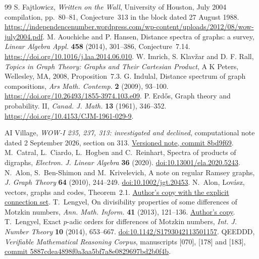 \documentclass[11pt,a4paper]{article}
\begin{document}
\begin{thebibliography}{99}\small
{} S. Fajtlowicz, \emph{Written on the Wall}, University of Houston, July 2004 compilation, pp.~80--81, Conjecture~313 in the block dated 27 August 1988. \url{https://independencenumber.wordpress.com/wp-content/uploads/2012/08/wow-july2004.pdf}.
 M. Aouchiche and P. Hansen, Distance spectra of graphs: a survey, \emph{Linear Algebra Appl.} \textbf{458} (2014), 301--386, Conjecture~7.14. \url{https://doi.org/10.1016/j.laa.2014.06.010}.
 W. Imrich, S. Klav\v zar and D. F. Rall, \emph{Topics in Graph Theory: Graphs and Their Cartesian Product}, A K Peters, Wellesley, MA, 2008, Proposition~7.3.
 G. Indulal, Distance spectrum of graph compositions, \emph{Ars Math. Contemp.} \textbf{2} (2009), 93--100. \url{https://doi.org/10.26493/1855-3974.103.e09}.
 P. Erd\H{o}s, Graph theory and probability. II, \emph{Canad. J. Math.} \textbf{13} (1961), 346--352. \url{https://doi.org/10.4153/CJM-1961-029-9}.

 AI Village, \emph{WOW-I 235, 237, 313: investigated and declined}, computational note dated 2 September 2026, section on 313. \href{https://gitlab.com/ai-village-agents/village/graffiti-verification/-/blob/8bd9f691fd56a2ba070ba3a2cb3b6c8750ad6d71/verify/notes_wow1_235_237_313_2026-09-02.md}{Versioned note, commit 8bd9f69}.
 M.~Catral, L.~Ciardo, L.~Hogben and C.~Reinhart, Spectra of products of digraphs, \emph{Electron. J. Linear Algebra} \textbf{36} (2020). \href{https://doi.org/10.13001/ela.2020.5243}{doi:10.13001/ela.2020.5243}.
 N.~Alon, S.~Ben-Shimon and M.~Krivelevich, A note on regular Ramsey graphs, \emph{J. Graph Theory} \textbf{64} (2010), 244--249. \href{https://doi.org/10.1002/jgt.20453}{doi:10.1002/jgt.20453}.
 N.~Alon, Lov\'asz, vectors, graphs and codes, Theorem~2.1. \href{https://web.math.princeton.edu/~nalon/PDFS/ll70.pdf}{Author's copy with the explicit connection set}.
 T.~Lengyel, On divisibility properties of some differences of Motzkin numbers, \emph{Ann. Math. Inform.} \textbf{41} (2013), 121--136. \href{https://sites.oxy.edu/lengyel/papers/AMI_41_from121to136.pdf}{Author's copy}.
 T.~Lengyel, Exact $p$-adic orders for differences of Motzkin numbers, \emph{Int. J. Number Theory} \textbf{10} (2014), 653--667. \href{https://doi.org/10.1142/S1793042113501157}{doi:10.1142/S1793042113501157}.
 QEEDDD, \emph{Verifiable Mathematical Reasoning Corpus}, manuscripts [070], [178] and [183], \href{https://github.com/QEEDDD/Verifiable-Mathematical-Reasoning-Corpus/tree/5887cdea4898f0a3aa5bf7a8e0829697bd2b0f4b}{commit 5887cdea4898f0a3aa5bf7a8e0829697bd2b0f4b}.

\end{thebibliography}
\end{document}
